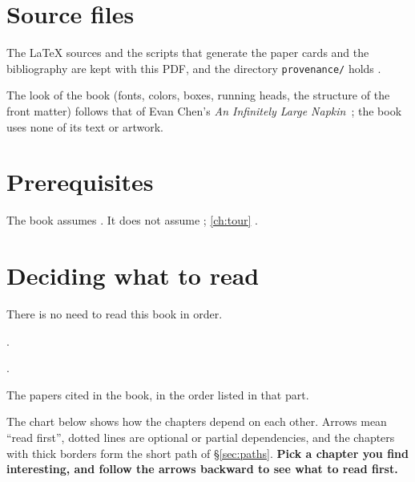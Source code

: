 \section*{Source files}

The LaTeX sources and the scripts that generate the paper cards and the bibliography are kept with this PDF, and
the directory \texttt{provenance/} holds .

The look of the book (fonts, colors, boxes, running heads, the structure of the front matter) follows that of
Evan Chen's \emph{An Infinitely Large Napkin}~\cite{chen2024napkin}; the book uses none of its text or artwork.

\label{ch:advice}
\setcounter{section}{0}
\renewcommand{\thesection}{\arabic{section}}

\section{Prerequisites}

The book assumes . It does not assume ; \cref{ch:tour} .

\section{Deciding what to read}

There is no need to read this book in order.

\begin{description}[leftmargin=!,labelwidth=4.7cm,font=\sffamily\bfseries\color{maroon},itemsep=2pt]
  \item[Part~\ref{part:start}: Getting started] .
  \item[Part~\ref{part:literature}: The literature] .
  \item[Part~\ref{part:papers}: The papers] The papers cited in the book, in the order listed in that part.
\end{description}

The chart below shows how the chapters depend on each other. Arrows mean ``read first'', dotted lines are optional
or partial dependencies, and the chapters with thick borders form the short path of \S\ref{sec:paths}.
\textbf{Pick a chapter you find interesting, and follow the arrows backward to see what to read first.}

